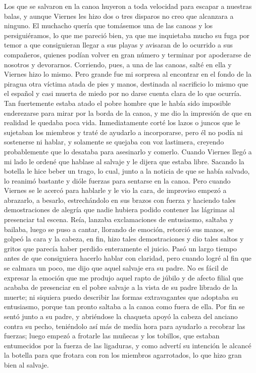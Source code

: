\documentclass{novela}
\begin{document}
    Los que se salvaron en la canoa huyeron a toda velocidad para escapar a nuestras balas, y aunque Viernes les hizo dos o tres disparos no creo que alcanzara a ninguno. El muchacho quería que tomásemos una de las canoas y los persiguiéramos, lo que me pareció bien, ya que me inquietaba mucho su fuga por temor a que consiguieran llegar a sus playas y avisaran de lo ocurrido a sus compañeros, quienes podían volver en gran número y terminar por apoderarse de nosotros y devorarnos. Corriendo, pues, a una de las canoas, salté en ella y Viernes hizo lo mismo. Pero grande fue mi sorpresa al encontrar en el fondo de la piragua otra víctima atada de pies y manos, destinada al sacrificio lo mismo que el español y casi muerta de miedo por no darse cuenta clara de lo que ocurría. Tan fuertemente estaba atado el pobre hombre que le había sido imposible enderezarse para mirar por la borda de la canoa, y me dio la impresión de que en realidad le quedaba poca vida.
    Inmediatamente corté los lazos o juncos que le sujetaban los miembros y traté de ayudarlo a incorporarse, pero él no podía ni sostenerse ni hablar, y solamente se quejaba con voz lastimera, creyendo probablemente que lo desataba para asesinarlo y comerlo.
    Cuando Viernes llegó a mi lado le ordené que hablase al salvaje y le dijera que estaba libre. Sacando la botella le hice beber un trago, lo cual, junto a la noticia de que se había salvado, lo reanimó bastante y dióle fuerzas para sentarse en la canoa. Pero cuando Viernes se le acercó para hablarle y le vio la cara, de improviso empezó a abrazarlo, a besarlo, estrechándolo en sus brazos con fuerza y haciendo tales demostraciones de alegría que nadie hubiera podido contener las lágrimas al presenciar tal escena. Reía, lanzaba exclamaciones de entusiasmo, saltaba y bailaba, luego se puso a cantar, llorando de emoción, retorció sus manos, se golpeó la cara y la cabeza, en fin, hizo tales demostraciones y dio tales saltos y gritos que parecía haber perdido enteramente el juicio. Pasó un largo tiempo antes de que consiguiera hacerlo hablar con claridad, pero cuando logré al fin que se calmara un poco, me dijo que aquel salvaje era su padre.
    No es fácil de expresar la emoción que me produjo aquel rapto de júbilo y de afecto filial que acababa de presenciar en el pobre salvaje a la vista de su padre librado de la muerte; ni siquiera puedo describir las formas extravagantes que adoptaba su entusiasmo, porque tan pronto saltaba a la canoa como fuera de ella. Por fin se sentó junto a su padre, y abriéndose la chaqueta apoyó la cabeza del anciano contra su pecho, teniéndolo así más de media hora para ayudarlo a recobrar las fuerzas; luego empezó a frotarle las muñecas y los tobillos, que estaban entumecidos por la fuerza de las ligaduras, y como advertí su intención le alcancé la botella para que frotara con ron los miembros agarrotados, lo que hizo gran bien al salvaje.
\end{document}
